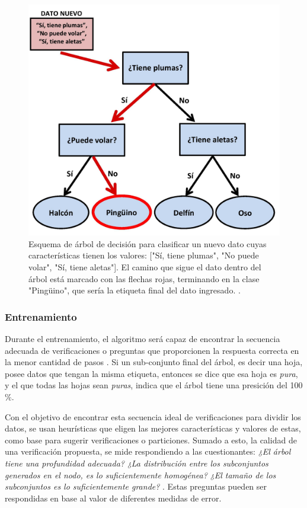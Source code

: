\begin{figure}[h]
  \centering
  \includegraphics[width=13cm]{figures/image13.jpg}
  \caption[Esquema de árbol de decisión para clasificar un nuevo dato (de tipo \textit{animal}).]{Esquema de árbol de decisión para clasificar un nuevo dato cuyas características tienen los valores: ["Sí, tiene plumas", "No puede volar", "Sí, tiene aletas"]. El camino que sigue el dato dentro del árbol está marcado con las flechas rojas, terminando en la clase "Pingüino", que sería la etiqueta final del dato ingresado.
  .}
  \label{fig:tree2}
\end{figure}

\subsubsection{Entrenamiento}
Durante el entrenamiento, el algoritmo será capaz de encontrar la secuencia adecuada de verificaciones o preguntas que proporcionen la respuesta correcta en la menor cantidad de pasos \cite{Muller}. Si un sub-conjunto final del árbol, es decir una hoja, posee datos que tengan la misma etiqueta, entonces se dice que esa hoja es \textit{pura}, y el que todas las hojas sean \textit{puras}, indica que el árbol tiene una presición del 100$\%$.

Con el objetivo de encontrar esta secuencia ideal de verificaciones para dividir los datos, se usan heurísticas que eligen las mejores características y valores de estas, como base para sugerir verificaciones o particiones. Sumado a esto, la calidad de una verificación propuesta, se mide respondiendo a las cuestionantes: \textit{¿El árbol tiene una profundidad adecuada?} \textit{¿La distribución entre los subconjuntos generados en el nodo, es lo suficientemente homogénea?} \textit{¿El tamaño de los subconjuntos es lo suficientemente grande?} \cite[Capítulo 16]{Murphy}. Estas preguntas pueden ser respondidas en base al valor de diferentes medidas de error.
%

